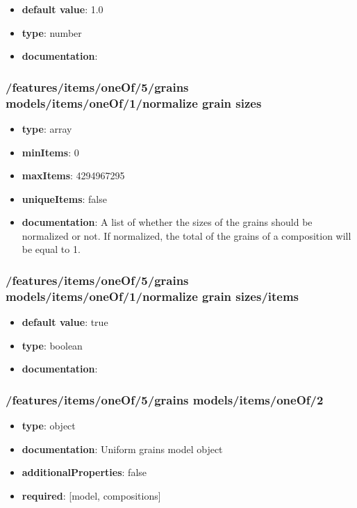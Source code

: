 \begin{itemize}\item {\bf default value}: 1.0
\item {\bf type}: number
\item {\bf documentation}: 
\end{itemize}\subsubsection{/features/items/oneOf/5/grains models/items/oneOf/1/normalize grain sizes}
\begin{itemize}\item {\bf type}: array
\item {\bf minItems}: 0
\item {\bf maxItems}: 4294967295
\item {\bf uniqueItems}: false
\item {\bf documentation}: A list of whether the sizes of the grains should be normalized or not. If normalized, the total of the grains of a composition will be equal to 1.
\end{itemize}\subsubsection{/features/items/oneOf/5/grains models/items/oneOf/1/normalize grain sizes/items}
\begin{itemize}\item {\bf default value}: true
\item {\bf type}: boolean
\item {\bf documentation}: 
\end{itemize}\subsubsection{/features/items/oneOf/5/grains models/items/oneOf/2}
\begin{itemize}\item {\bf type}: object
\item {\bf documentation}: Uniform grains model object
\item {\bf additionalProperties}: false
\item {\bf required}: [model, compositions]\end{itemize}
